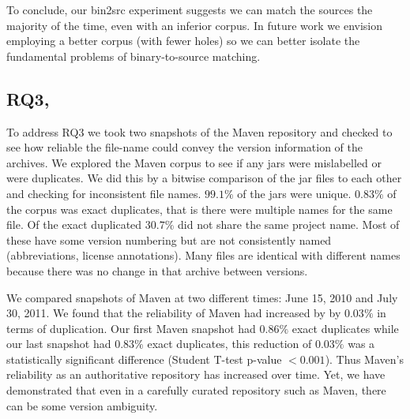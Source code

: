To conclude, our bin2src experiment suggests we can match the sources the
majority of the time, even with an inferior corpus.  In future work we
envision employing a better corpus (with fewer holes) so we can better
isolate the fundamental problems of binary-to-source matching.







\subsection{RQ3, \rqThree}
\label{sec:mavenreliability}

To address RQ3 we took two snapshots of the Maven repository and checked to
see how reliable the file-name could convey the version information of the
archives.  We explored the Maven corpus to see if any jars were mislabelled
or were duplicates. We did this by a bitwise comparison of the jar files to
each other and checking for inconsistent file names. $99.1\%$ of the jars
were unique.  $0.83\%$ of the corpus was exact duplicates, that is there
were multiple names for the same file.  Of the exact duplicated $30.7\%$
did not share the same project name.  Most of these have some version
numbering but are not consistently named (abbreviations, license
annotations). Many files are identical with different names because there
was no change in that archive between versions.

We compared snapshots of Maven at two different times: June 15, 2010 and
July 30, 2011. We found that the reliability of Maven had increased by by
$0.03\%$ in terms of duplication.  Our first Maven snapshot had $0.86\%$
exact duplicates while our last snapshot had $0.83\%$ exact duplicates,
this reduction of $0.03\%$ was a statistically significant difference
(Student T-test p-value $< 0.001$).  Thus Maven's reliability as an
authoritative repository has increased over time. Yet, we have demonstrated
that even in a carefully curated repository such as Maven, there can be
some version ambiguity.

